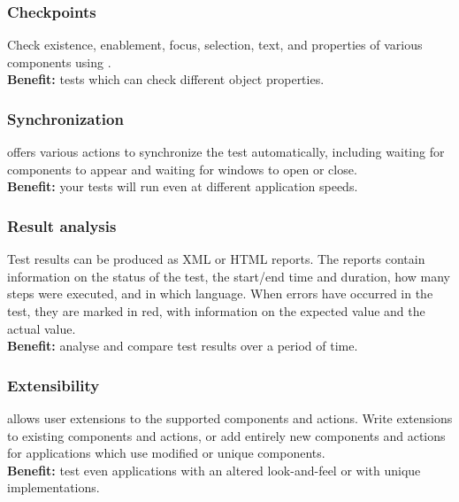 \subsubsection{Checkpoints}
Check existence, enablement, focus, selection, text, and properties of various components using \gdsteps{}.\\ 
\textbf{Benefit:} tests which can check different object properties. 

\subsubsection{Synchronization}
\jb{} offers various actions to synchronize the test automatically, including waiting for components to appear and waiting for windows to open or close.\\
\textbf{Benefit:} your tests will run even at different application speeds.

\subsubsection{Result analysis}
Test results can be produced as XML or HTML reports. The reports contain information on the status of the test, the start/end time and duration, how many steps were executed, and in which language. When errors have occurred in the test, they are marked in red, with information on the expected value and the actual value. \\
\textbf{Benefit:} analyse and compare test results over a period of time.


\subsubsection{Extensibility}
\jb{} allows user extensions to the supported components and actions. Write extensions to existing components and actions, or add entirely new components and actions for applications which use modified or unique components. \\
\textbf{Benefit:} test even applications with an altered look-and-feel or with unique implementations. 

 



